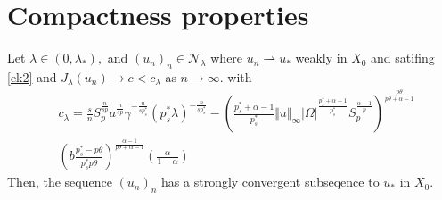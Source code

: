 \documentclass[10pt,twoside,reqno,centertags,draft]{amsart}
\begin{document}
\section{Compactness properties}
\begin{proposition}\label{pr1}
Let $\lambda \in (0, \lambda_*),$ and $ (u_n)_n \in \mathcal{N}_{\lambda}$ where $ u_n \rightharpoonup u_*$ weakly in $ X_0$ and satifing \ref{ek2} and
$ J_{\lambda}(u_n) \longrightarrow c < c_{\lambda}$ as $ n \to \infty.$ with 
{\scriptsize
\begin{equation}\label{lev}
\begin{aligned}
& c_{\lambda} =\frac{s}{n} S_{p}^{\frac{n}{s p}}a^{\frac{n}{sp}} \gamma^{-\frac{n}{sp_s^*}}(p_s^* \lambda)^{-\frac{n}{s p_s^*}} -\left(\frac{p_s^* +\alpha -1}{p_s^*}\Vert u\Vert_{\infty}\vert \Omega\vert^{\frac{p_s^* +\alpha -1}{p_s^*}}S_{p}^{\frac{\alpha -1}{p}}\right)^{\frac{p\theta}{p\theta +\alpha -1}}\\
& \left( b\frac{p_s^* -p\theta}{p_s^*p\theta}\right)^{\frac{\alpha -1}{p\theta +\alpha -1}}\left( \frac{\alpha}{1 -\alpha}\right)
 \end{aligned}
\end{equation}
}
Then, the sequence $ (u_n)_n$ has a strongly convergent subseqence to $ u_*$ in $ X_0.$ 
\end{proposition}
\end{document}
